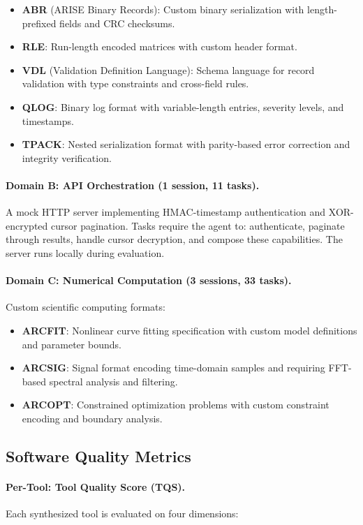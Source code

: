 \documentclass[10pt,twocolumn]{article}
\begin{document}
\begin{itemize}
\item \textbf{ABR} (ARISE Binary Records): Custom binary serialization with length-prefixed fields and CRC checksums.
\item \textbf{RLE}: Run-length encoded matrices with custom header format.
\item \textbf{VDL} (Validation Definition Language): Schema language for record validation with type constraints and cross-field rules.
\item \textbf{QLOG}: Binary log format with variable-length entries, severity levels, and timestamps.
\item \textbf{TPACK}: Nested serialization format with parity-based error correction and integrity verification.
\end{itemize}

\paragraph{Domain B: API Orchestration (1 session, 11 tasks).} A mock HTTP server implementing HMAC-timestamp authentication and XOR-encrypted cursor pagination. Tasks require the agent to: authenticate, paginate through results, handle cursor decryption, and compose these capabilities. The server runs locally during evaluation.

\paragraph{Domain C: Numerical Computation (3 sessions, 33 tasks).} Custom scientific computing formats:

\begin{itemize}
\item \textbf{ARCFIT}: Nonlinear curve fitting specification with custom model definitions and parameter bounds.
\item \textbf{ARCSIG}: Signal format encoding time-domain samples and requiring FFT-based spectral analysis and filtering.
\item \textbf{ARCOPT}: Constrained optimization problems with custom constraint encoding and boundary analysis.
\end{itemize}

\subsection{Software Quality Metrics}

\paragraph{Per-Tool: Tool Quality Score (TQS).}
Each synthesized tool is evaluated on four dimensions:
\end{document}
